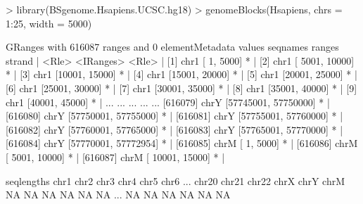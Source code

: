 \begin{Schunk}
\begin{Sinput}
> library(BSgenome.Hsapiens.UCSC.hg18)
> genomeBlocks(Hsapiens, chrs = 1:25, width = 5000)
\end{Sinput}
\begin{Soutput}
GRanges with 616087 ranges and 0 elementMetadata values
         seqnames               ranges strand   |
            <Rle>            <IRanges>  <Rle>   |
     [1]     chr1       [    1,  5000]      *   |
     [2]     chr1       [ 5001, 10000]      *   |
     [3]     chr1       [10001, 15000]      *   |
     [4]     chr1       [15001, 20000]      *   |
     [5]     chr1       [20001, 25000]      *   |
     [6]     chr1       [25001, 30000]      *   |
     [7]     chr1       [30001, 35000]      *   |
     [8]     chr1       [35001, 40000]      *   |
     [9]     chr1       [40001, 45000]      *   |
     ...      ...                  ...    ... ...
[616079]     chrY [57745001, 57750000]      *   |
[616080]     chrY [57750001, 57755000]      *   |
[616081]     chrY [57755001, 57760000]      *   |
[616082]     chrY [57760001, 57765000]      *   |
[616083]     chrY [57765001, 57770000]      *   |
[616084]     chrY [57770001, 57772954]      *   |
[616085]     chrM [       1,     5000]      *   |
[616086]     chrM [    5001,    10000]      *   |
[616087]     chrM [   10001,    15000]      *   |

seqlengths
  chr1  chr2  chr3  chr4  chr5  chr6 ... chr20 chr21 chr22  chrX  chrY  chrM
    NA    NA    NA    NA    NA    NA ...    NA    NA    NA    NA    NA    NA
\end{Soutput}
\end{Schunk}
